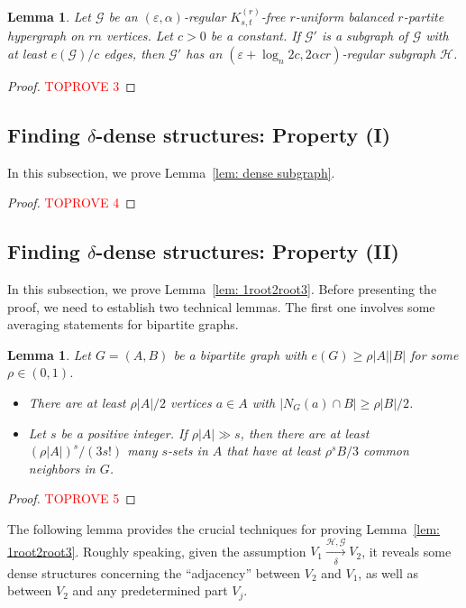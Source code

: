 \documentclass[11pt]{article}
\newtheorem{lem}[dfn]{Lemma}
\begin{document}
\begin{lem} \label{coro: regular graph subgraph}
Let $\mathcal G$  be   an $(\varepsilon,\alpha)$-regular $K_{s,t}^{(r)}$-free $r$-uniform balanced $r$-partite hypergraph on $rn$ vertices.
Let $c>0$ be a constant.
If $\mathcal G'$ is a subgraph of $\mathcal G$ with at least $e(\mathcal G)/c$ edges,
then $\mathcal G'$ has an $(\varepsilon +\log_n{2c}, 2\alpha cr)$-regular subgraph $\mathcal H$.
\end{lem}
\begin{proof}\textcolor{red}{TOPROVE 3}\end{proof}



\subsection{Finding $\delta$-dense structures: Property (I)}
In this subsection, we prove Lemma~\ref{lem: dense subgraph}.

\begin{proof}\textcolor{red}{TOPROVE 4}\end{proof}


\subsection{Finding $\delta$-dense structures: Property (II)}
In this subsection, we prove Lemma~\ref{lem: 1root2root3}.
Before presenting the proof, we need to establish two technical lemmas.
The first one involves some averaging statements for bipartite graphs.

\begin{lem}\label{lem: bipartite average}
Let $G=(A,B)$ be a bipartite graph with $e(G)\geq \rho|A||B|$ for some $\rho\in (0,1)$.
\begin{itemize}
  \item[(1).] There are at least $\rho |A|/2$ vertices $a\in A$ with $|N_G(a)\cap B |\ge \rho |B |/2$.
  \item[(2).] Let $s$ be a positive integer. If $\rho |A|\gg s$, then there are at least $(\rho |A|)^s/(3s!)$  many $s$-sets in $A$ that have at least $\rho^s B/3$ common neighbors in $G$.
\end{itemize}
\end{lem}
\begin{proof}\textcolor{red}{TOPROVE 5}\end{proof}

The following lemma provides the crucial techniques for proving Lemma~\ref{lem: 1root2root3}.
Roughly speaking, given the assumption $V_1 \xrightarrow[\delta]{\mathcal H, \mathcal G} V_2$,
it reveals some dense structures concerning the ``adjacency'' between $V_2$ and $V_1$, as well as between $V_2$ and any predetermined part $V_j$.
\end{document}
